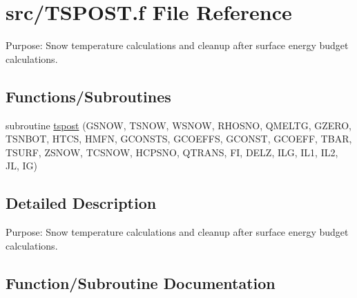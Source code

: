 \hypertarget{TSPOST_8f}{}\section{src/\+T\+S\+P\+O\+S\+T.f File Reference}
\label{TSPOST_8f}


Purpose\+: Snow temperature calculations and cleanup after surface energy budget calculations.  


\subsection*{Functions/\+Subroutines}
\begin{DoxyCompactItemize}
\item 
subroutine \hyperlink{TSPOST_8f_aea20a5bd0b4d139bb0537c5e0a79788f}{tspost} (G\+S\+N\+O\+W, T\+S\+N\+O\+W, W\+S\+N\+O\+W, R\+H\+O\+S\+N\+O, Q\+M\+E\+L\+T\+G, G\+Z\+E\+R\+O, T\+S\+N\+B\+O\+T, H\+T\+C\+S, H\+M\+F\+N, G\+C\+O\+N\+S\+T\+S, G\+C\+O\+E\+F\+F\+S, G\+C\+O\+N\+S\+T, G\+C\+O\+E\+F\+F, T\+B\+A\+R, T\+S\+U\+R\+F, Z\+S\+N\+O\+W, T\+C\+S\+N\+O\+W, H\+C\+P\+S\+N\+O, Q\+T\+R\+A\+N\+S, F\+I, D\+E\+L\+Z, I\+L\+G, I\+L1, I\+L2, J\+L, I\+G)
\end{DoxyCompactItemize}


\subsection{Detailed Description}
Purpose\+: Snow temperature calculations and cleanup after surface energy budget calculations. 



\subsection{Function/\+Subroutine Documentation}
\hypertarget{TSPOST_8f_aea20a5bd0b4d139bb0537c5e0a79788f}{}

